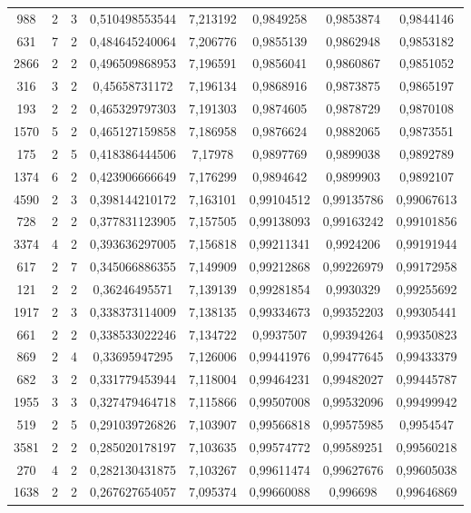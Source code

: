 \begin{longtable}{|c|c|c|c|c|c|c|c|}
988 & 2 & 3 & 0,510498553544 & 7,213192 & 0,9849258 & 0,9853874 & 0,9844146 \\
631 & 7 & 2 & 0,484645240064 & 7,206776 & 0,9855139 & 0,9862948 & 0,9853182 \\
2866 & 2 & 2 & 0,496509868953 & 7,196591 & 0,9856041 & 0,9860867 & 0,9851052 \\
316 & 3 & 2 & 0,45658731172 & 7,196134 & 0,9868916 & 0,9873875 & 0,9865197 \\
193 & 2 & 2 & 0,465329797303 & 7,191303 & 0,9874605 & 0,9878729 & 0,9870108 \\
1570 & 5 & 2 & 0,465127159858 & 7,186958 & 0,9876624 & 0,9882065 & 0,9873551 \\
175 & 2 & 5 & 0,418386444506 & 7,17978 & 0,9897769 & 0,9899038 & 0,9892789 \\
1374 & 6 & 2 & 0,423906666649 & 7,176299 & 0,9894642 & 0,9899903 & 0,9892107 \\
4590 & 2 & 3 & 0,398144210172 & 7,163101 & 0,99104512 & 0,99135786 & 0,99067613 \\
728 & 2 & 2 & 0,377831123905 & 7,157505 & 0,99138093 & 0,99163242 & 0,99101856 \\
3374 & 4 & 2 & 0,393636297005 & 7,156818 & 0,99211341 & 0,9924206 & 0,99191944 \\
617 & 2 & 7 & 0,345066886355 & 7,149909 & 0,99212868 & 0,99226979 & 0,99172958 \\
121 & 2 & 2 & 0,36246495571 & 7,139139 & 0,99281854 & 0,9930329 & 0,99255692 \\
1917 & 2 & 3 & 0,338373114009 & 7,138135 & 0,99334673 & 0,99352203 & 0,99305441 \\
661 & 2 & 2 & 0,338533022246 & 7,134722 & 0,9937507 & 0,99394264 & 0,99350823 \\
869 & 2 & 4 & 0,33695947295 & 7,126006 & 0,99441976 & 0,99477645 & 0,99433379 \\
682 & 3 & 2 & 0,331779453944 & 7,118004 & 0,99464231 & 0,99482027 & 0,99445787 \\
1955 & 3 & 3 & 0,327479464718 & 7,115866 & 0,99507008 & 0,99532096 & 0,99499942 \\
519 & 2 & 5 & 0,291039726826 & 7,103907 & 0,99566818 & 0,99575985 & 0,9954547 \\
3581 & 2 & 2 & 0,285020178197 & 7,103635 & 0,99574772 & 0,99589251 & 0,99560218 \\
270 & 4 & 2 & 0,282130431875 & 7,103267 & 0,99611474 & 0,99627676 & 0,99605038 \\
1638 & 2 & 2 & 0,267627654057 & 7,095374 & 0,99660088 & 0,996698 & 0,99646869 \\

\end{longtable}
